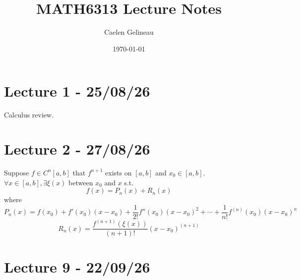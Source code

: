 \documentclass[11pt]{article}
\title{MATH6313 Lecture Notes}
\author{Caelen Gelineau}
\date{\today}
\begin{document}
\maketitle
\tableofcontents
\newpage

\section{Lecture 1 - 25/08/26}
Calculus review.

\section{Lecture 2 - 27/08/26}
\begin{theorem}
    Suppose $f \in C^n[a,b]$ that $f^{n+1}$ exists on $[a,b]$ and $x_0 \in [a,b]$. $\forall x \in [a,b], \exists \xi (x)$ between $x_0$ and $x$ s.t.
    \[
        f(x) = P_n(x) + R_n(x)
    \]
    where
    \[
        P_n(x)=f(x_0)+f'(x_0)(x-x_0)+\frac{1}{2!}f''(x_0)(x-x_0)^2+\cdots + \frac{1}{n!} f^{(n)}(x_0) (x-x_0)^n
    \]
    \[
        R_n(x) = \frac{f^{(n+1)}(\xi (x))}{(n+1)!}(x-x_0)^{(n+1)}
    \]
    
\end{theorem}

\section{Lecture 9 - 22/09/26}
\end{document}
